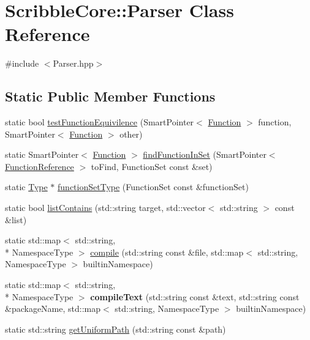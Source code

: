 \hypertarget{class_scribble_core_1_1_parser}{\section{Scribble\-Core\-:\-:Parser Class Reference}
\label{class_scribble_core_1_1_parser}
}


{\ttfamily \#include $<$Parser.\-hpp$>$}

\subsection*{Static Public Member Functions}
\begin{DoxyCompactItemize}
\item 
static bool \hyperlink{class_scribble_core_1_1_parser_a6f3623acbf4ecf36d07d8e08393d5755}{test\-Function\-Equivilence} (Smart\-Pointer$<$ \hyperlink{class_a_p_i_1_1_function}{Function} $>$ function, Smart\-Pointer$<$ \hyperlink{class_a_p_i_1_1_function}{Function} $>$ other)
\item 
static Smart\-Pointer$<$ \hyperlink{class_a_p_i_1_1_function}{Function} $>$ \hyperlink{class_scribble_core_1_1_parser_a4d9e4e3d19bad8b983cbff320ba40ad1}{find\-Function\-In\-Set} (Smart\-Pointer$<$ \hyperlink{class_scribble_core_1_1_function_reference}{Function\-Reference} $>$ to\-Find, Function\-Set const \&set)
\item 
static \hyperlink{class_scribble_core_1_1_type}{Type} $\ast$ \hyperlink{class_scribble_core_1_1_parser_a0e1829847a648294f57e634fa7b21782}{function\-Set\-Type} (Function\-Set const \&function\-Set)
\item 
static bool \hyperlink{class_scribble_core_1_1_parser_a13bb70c6085507b7dcd5fccc7f20d37c}{list\-Contains} (std\-::string target, std\-::vector$<$ std\-::string $>$ const \&list)
\item 
static std\-::map$<$ std\-::string, \\*
Namespace\-Type $>$ \hyperlink{class_scribble_core_1_1_parser_a6868988e45190dbb366f834b33505902}{compile} (std\-::string const \&file, std\-::map$<$ std\-::string, Namespace\-Type $>$ builtin\-Namespace)
\item 
\hypertarget{class_scribble_core_1_1_parser_a1aaaf22583e0bf60a1e27227bed9511b}{static std\-::map$<$ std\-::string, \\*
Namespace\-Type $>$ {\bfseries compile\-Text} (std\-::string const \&text, std\-::string const \&package\-Name, std\-::map$<$ std\-::string, Namespace\-Type $>$ builtin\-Namespace)}\label{class_scribble_core_1_1_parser_a1aaaf22583e0bf60a1e27227bed9511b}

\item 
static std\-::string \hyperlink{class_scribble_core_1_1_parser_aa052d5111bdc10523060670714b409ab}{get\-Uniform\-Path} (std\-::string const \&path)
\end{DoxyCompactItemize}


